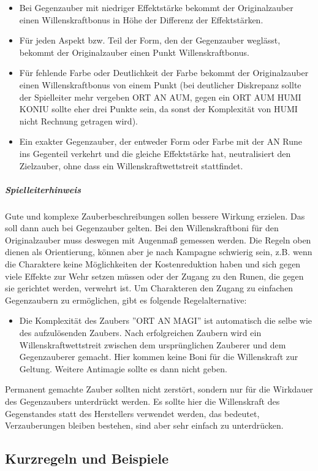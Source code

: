 \documentclass{article}
\begin{document}
\begin{itemize}
\item Bei Gegenzauber mit niedriger Effektstärke bekommt der Originalzauber einen Willenskraftbonus in Höhe der Differenz der Effektstärken.
\item Für jeden Aspekt bzw. Teil der Form, den der Gegenzauber weglässt, bekommt der Originalzauber einen Punkt Willenskraftbonus. 
\item Für fehlende Farbe oder Deutlichkeit der Farbe bekommt der Originalzauber einen Willenskraftbonus von einem Punkt (bei deutlicher Diskrepanz sollte der Spielleiter mehr vergeben ORT AN AUM, gegen ein ORT AUM HUMI KONIU sollte eher drei Punkte sein, da sonst der Komplexität von HUMI nicht Rechnung getragen wird).
\item Ein exakter Gegenzauber, der entweder Form oder Farbe mit der AN Rune ins Gegenteil verkehrt und die gleiche Effektstärke hat, neutralisiert den Zielzauber, ohne dass ein Willenskraftwettstreit stattfindet.
\end{itemize}

\begin{mdframed}[hidealllines=true, backgroundcolor=black!10]
\subparagraph{Spielleiterhinweis}

Gute und komplexe Zauberbeschreibungen sollen bessere Wirkung erzielen. Das soll dann auch bei Gegenzauber gelten.
Bei den Willenskraftboni für den Originalzauber muss deswegen mit Augenmaß gemessen werden. Die Regeln oben dienen
als Orientierung, können aber je nach Kampagne schwierig sein, z.B. wenn die Charaktere keine Möglichkeiten der
Kostenreduktion haben und sich gegen viele Effekte zur Wehr setzen müssen oder der Zugang zu den Runen, die gegen sie
gerichtet werden, verwehrt ist. Um Charakteren den Zugang zu einfachen Gegenzaubern zu ermöglichen, gibt es folgende
Regelalternative:

\begin{itemize}
\item Die Komplexität des Zaubers ''ORT AN MAGI'' ist automatisch die selbe wie des aufzulösenden Zaubers. Nach erfolgreichen Zaubern wird ein Willenskraftwettstreit zwischen dem ursprünglichen Zauberer und dem Gegenzauberer gemacht. Hier kommen keine Boni für die Willenskraft zur Geltung. Weitere Antimagie sollte es dann nicht geben.
\end{itemize}

Permanent gemachte Zauber sollten nicht zerstört, sondern nur für die Wirkdauer des Gegenzaubers unterdrückt werden. Es
sollte hier die Willenskraft des Gegenstandes statt des Herstellers verwendet werden, das bedeutet, Verzauberungen
bleiben bestehen, sind aber sehr einfach zu unterdrücken.

\end{mdframed}
\begin{center}
\subsection{Kurzregeln und Beispiele}
\end{center}
\end{document}
